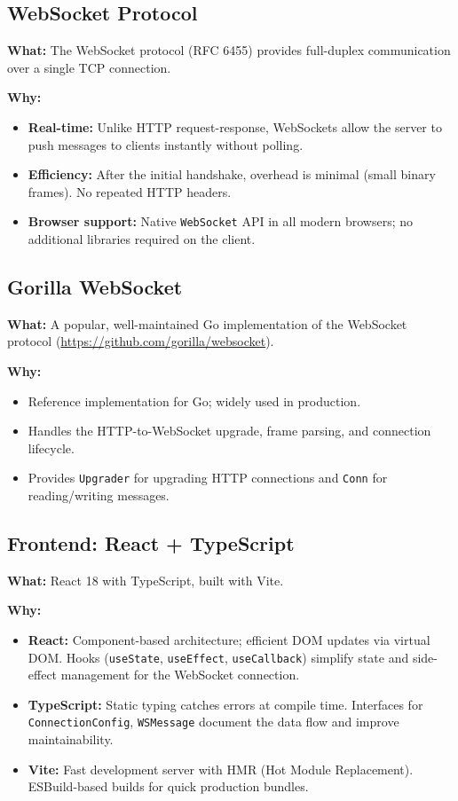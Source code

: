 \documentclass[11pt,a4paper]{article}
\begin{document}
\subsection{WebSocket Protocol}

\textbf{What:} The WebSocket protocol (RFC 6455) provides full-duplex communication over a single TCP connection.

\textbf{Why:}
\begin{itemize}
    \item \textbf{Real-time:} Unlike HTTP request-response, WebSockets allow the server to push messages to clients instantly without polling.
    \item \textbf{Efficiency:} After the initial handshake, overhead is minimal (small binary frames). No repeated HTTP headers.
    \item \textbf{Browser support:} Native \texttt{WebSocket} API in all modern browsers; no additional libraries required on the client.
\end{itemize}

\subsection{Gorilla WebSocket}

\textbf{What:} A popular, well-maintained Go implementation of the WebSocket protocol (\url{https://github.com/gorilla/websocket}).

\textbf{Why:}
\begin{itemize}
    \item Reference implementation for Go; widely used in production.
    \item Handles the HTTP-to-WebSocket upgrade, frame parsing, and connection lifecycle.
    \item Provides \texttt{Upgrader} for upgrading HTTP connections and \texttt{Conn} for reading/writing messages.
\end{itemize}

\subsection{Frontend: React + TypeScript}

\textbf{What:} React 18 with TypeScript, built with Vite.

\textbf{Why:}
\begin{itemize}
    \item \textbf{React:} Component-based architecture; efficient DOM updates via virtual DOM. Hooks (\texttt{useState}, \texttt{useEffect}, \texttt{useCallback}) simplify state and side-effect management for the WebSocket connection.
    \item \textbf{TypeScript:} Static typing catches errors at compile time. Interfaces for \texttt{ConnectionConfig}, \texttt{WSMessage} document the data flow and improve maintainability.
    \item \textbf{Vite:} Fast development server with HMR (Hot Module Replacement). ESBuild-based builds for quick production bundles.
\end{itemize}
\end{document}
